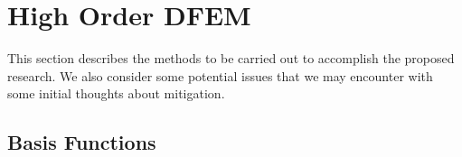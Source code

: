 \documentclass[12pt]{article}
\begin{document}
\section{High Order DFEM}
\label{sec:HODFEM}

This section describes the methods to be carried out to accomplish the proposed research. We also consider some potential issues that we may encounter with some initial thoughts about mitigation. 

\subsection{Basis Functions}


%
%
\end{document}
